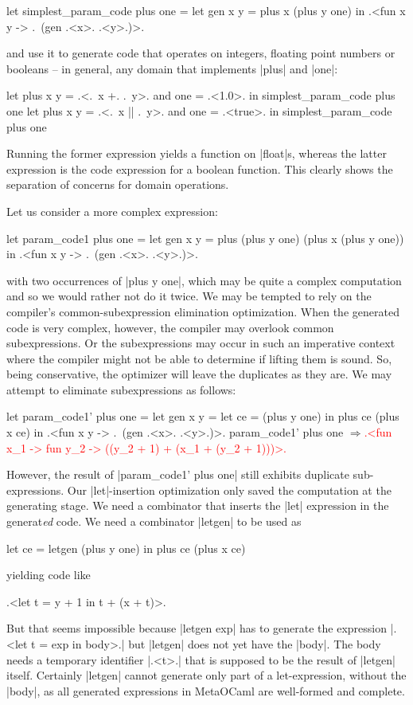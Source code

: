 \documentclass[draft]{elsart}
\newcommand{\evalresult}[1]{\ensuremath{\Longrightarrow}\textcolor{red}{#1}}
\begin{document}
\begin{code}
let simplest_param_code plus one =
  let gen x y = plus x (plus y one) in
  .<fun x y -> .~(gen .<x>. .<y>.)>.
\end{code}
and use it to generate code that operates on integers, floating point
numbers or booleans -- in general, any domain that implements |plus|
and |one|:
\begin{code}
let plus x y = .<.~x +. .~y>. and one = .<1.0>. in
  simplest_param_code plus one
let plus x y = .<.~x || .~y>. and one = .<true>. in
  simplest_param_code plus one
\end{code}
Running the former expression yields a function on |float|s, whereas
the latter expression is the code expression for a boolean function.
This clearly shows the separation of concerns for domain
operations.

Let us consider a more complex expression:
\begin{code}
let param_code1 plus one =
  let gen x y = plus (plus y one) (plus x (plus y one)) in
  .<fun x y -> .~(gen .<x>. .<y>.)>.
\end{code}
with two occurrences of |plus y one|,
which may be quite a complex computation and so we would rather not do
it twice. We may be tempted to rely on the compiler's
common-subexpression elimination optimization. When the generated code is
very complex, however, the compiler may overlook common subexpressions.  Or the
subexpressions may occur in such an imperative context where the compiler
might not be able to determine if lifting them is sound. So, being
conservative, the optimizer will leave the duplicates as they are. 
We may attempt to eliminate subexpressions as follows: 
\begin{code}
let param_code1' plus one =
  let gen x y = let ce = (plus y one) in  plus ce (plus x ce) in
  .<fun x y -> .~(gen .<x>. .<y>.)>.
param_code1' plus one
\evalresult{.<fun x_1 -> fun y_2 -> ((y_2 + 1) + (x_1 + (y_2 + 1)))>.}
\end{code}
However,
the result of |param_code1' plus one| still exhibits duplicate
sub-expressions.  Our |let|-insertion optimization only saved the
computation at the generating stage.  We need a combinator that
inserts the |let| expression in the generat\emph{ed} code. We need a
combinator |letgen| to be used as
\begin{code}
let ce = letgen (plus y one) in plus ce (plus x ce)
\end{code}
yielding code like 
\begin{code}
.<let t = y + 1 in t + (x + t)>.
\end{code}
But that seems impossible because |letgen exp| has to generate
the expression |.<let t = exp in body>.| but |letgen| does not yet
have the |body|. The body needs a temporary identifier |.<t>.|
that is supposed to be the result of |letgen| itself.  Certainly
|letgen| cannot generate only part of a let-expression, without the
|body|, as all generated expressions in MetaOCaml are well-formed and
complete.
\end{document}
